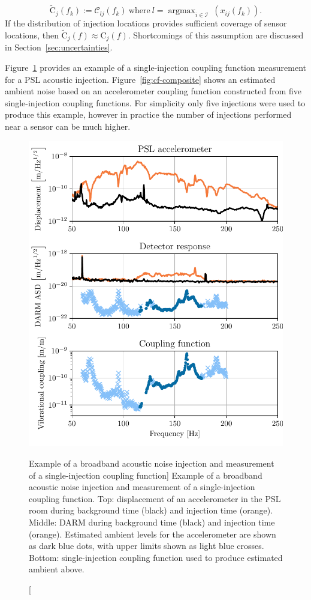 \begin{equation}\label{eq:ccf}
	\widetilde{\mathrm{C}}_j(f_k) := \mathcal{C}_{lj}(f_k)\ \mathrm{where}\ l = \mathop{argmax}_{i\in\mathcal{I}}\ (x_{ij}(f_k)).
\end{equation}
If the distribution of injection locations provides sufficient coverage of sensor locations, then $\widetilde{\mathrm{C}}_j(f) \approx \mathrm{C}_j(f)$.
Shortcomings of this assumption are discussed in Section~\ref{sec:uncertainties}.

Figure~\ref{fig:cf-example} provides an example of a single-injection coupling function measurement for a \ac{PSL} acoustic injection.
Figure~\ref{fig:cf-composite} shows an estimated ambient noise based on an accelerometer coupling function constructed from five single-injection coupling functions.
For simplicity only five injections were used to produce this example, however in practice the number of injections performed near a sensor can be much higher.

\begin{figure}
	\centering
	\includegraphics[width=\textwidth]{figures/noise-methods/cf-example.pdf}
	\caption
	[Example of a broadband acoustic noise injection and measurement of a single-injection coupling function]
	{
		Example of a broadband acoustic noise injection and measurement of a single-injection coupling function.
		Top: displacement of an accelerometer in the PSL room during background time (black) and injection time (orange).
		Middle: DARM during background time (black) and injection time (orange).
		Estimated ambient levels for the accelerometer are shown as dark blue dots, with upper limits shown as light blue crosses.
		Bottom: single-injection coupling function used to produce estimated ambient above.
		}
	\label{fig:cf-example}
\end{figure}

